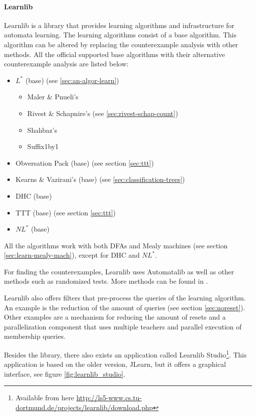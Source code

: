 \documentclass[multi,crop=false,class=article]{standalone}
\begin{document}
\paragraph{Learnlib} Learnlib is a library that provides learning algorithms and
infrastructure for automata learning. The learning algorithms consist of a base
algorithm. This algorithm can be altered by replacing the counterexample
analysis with other methods. All the official supported base algorithms with
their alternative counterexample analysis are listed below:

\begin{itemize}
	\item $L^*$ (base) (see \cref{sec:an-algor-learn})
	\begin{itemize}
		\item Maler \& Pnueli's \cite{Maler1995}
		\item Rivest \& Schapnire's (see \cref{sec:rivest-schap-count})
		\item Shahbaz's \cite{Shahbaz2009}
		\item Suffix1by1 \cite{Irfan2010}
	\end{itemize}
	\item Obversation Pack (base) (see section \ref{sec:ttt})
	\item Kearns \& Vazirani's (base) (see \cref{sec:classification-trees})
	\item DHC (base) \cite{Merten2012}
	\item TTT (base) (see section \cref{sec:ttt})
	\item $NL^*$ (base) \cite{Bollig2009}
\end{itemize}

All the algorithms work with both DFAs and Mealy machines (see section
\ref{sec:learn-mealy-mach}), except for DHC\cite{Merten2012} and
$NL^*$\cite{Bollig2009}.

For finding the counterexamples, Learnlib uses Automatalib as well as other
methods such as randomized tests. More methods can be found in
\cite[p. 490]{Isberner2015b}.

Learnlib also offers filters that pre-process the queries of the learning
algorithm. An example is the reduction of the amount of queries (see section
\ref{sec:noreset}). Other examples are a mechanism for reducing the amount of
resets  and a parallelization component that uses multiple teachers and
parallel execution of membership queries\cite{Henrix2015,Howar2012}.


Besides the library, there also exists an application called Learnlib 
Studio\footnote{Available from here 
	\url{http://ls5-www.cs.tu-dortmund.de/projects/learnlib/download.php}}. 
	This application is based on the older version, JLearn, but it offers a 
	graphical interface, see figure \ref{fig:learnlib_studio}. 
	
\end{document}
